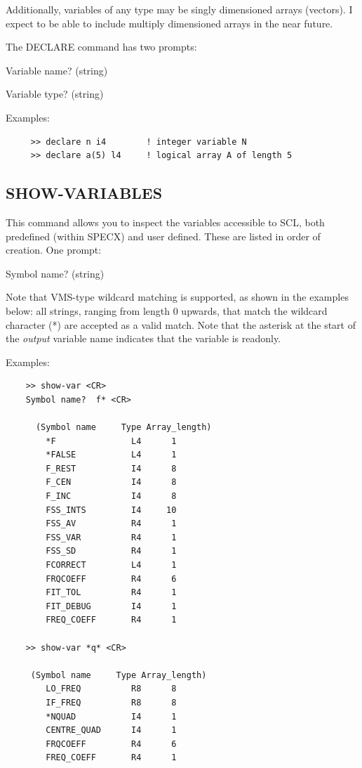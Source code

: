 \documentclass[11pt,twoside]{report}
\begin{document}
Additionally, variables of any type may be singly dimensioned arrays (vectors).
I expect to be able to include multiply dimensioned arrays in the near future.

The DECLARE command has two prompts:
\begin{description}
\item{}   Variable name?   (string)
\item{}   Variable type?   (string)
\end{description}

Examples:
\begin{verbatim}
     >> declare n i4        ! integer variable N
     >> declare a(5) l4     ! logical array A of length 5
\end{verbatim}


\subsection{SHOW-VARIABLES}

This command allows you to inspect the variables accessible to SCL,
both predefined (within SPECX) and user defined. These are listed in order of
creation. One prompt:
\begin{description}
\item{}           Symbol name?  (string)
\end{description}
Note that VMS-type wildcard matching is supported, as shown in the examples
below: all strings, ranging from length 0 upwards, that match the wildcard
character (*) are accepted as a valid match. Note that the asterisk at the
start of the {\em output} variable name indicates that the variable is 
readonly.

Examples:
\begin{verbatim}
    >> show-var <CR>
    Symbol name?  f* <CR>

      (Symbol name     Type Array_length)
        *F               L4      1
        *FALSE           L4      1
        F_REST           I4      8
        F_CEN            I4      8
        F_INC            I4      8
        FSS_INTS         I4     10
        FSS_AV           R4      1
        FSS_VAR          R4      1
        FSS_SD           R4      1
        FCORRECT         L4      1
        FRQCOEFF         R4      6
        FIT_TOL          R4      1
        FIT_DEBUG        I4      1
        FREQ_COEFF       R4      1

    >> show-var *q* <CR>

     (Symbol name     Type Array_length)
        LO_FREQ          R8      8
        IF_FREQ          R8      8
        *NQUAD           I4      1
        CENTRE_QUAD      I4      1
        FRQCOEFF         R4      6
        FREQ_COEFF       R4      1

\end{verbatim}
\end{document}
